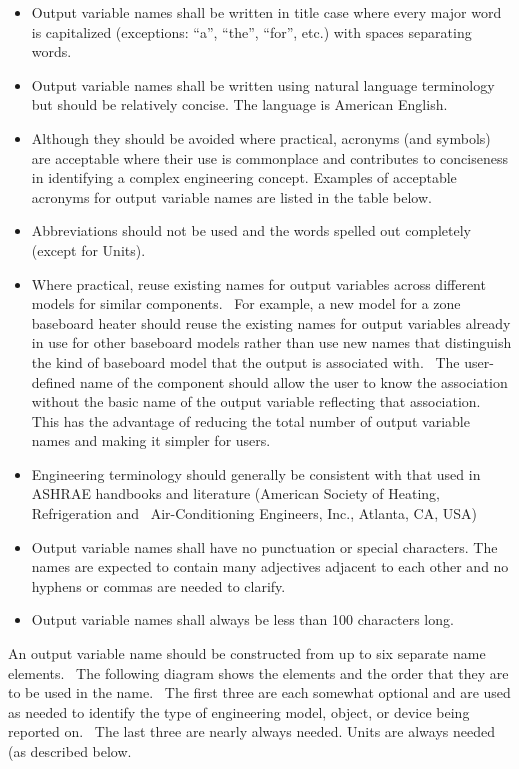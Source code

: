 \begin{itemize}
\item
  Output variable names shall be written in title case where every major word is capitalized (exceptions: ``a'', ``the'', ``for'', etc.) with spaces separating words.
\item
  Output variable names shall be written using natural language terminology but should be relatively concise. The language is American English.
\item
  Although they should be avoided where practical, acronyms (and symbols) are acceptable where their use is commonplace and contributes to conciseness in identifying a complex engineering concept. Examples of acceptable acronyms for output variable names are listed in the table below.
\item
  Abbreviations should not be used and the words spelled out completely (except for Units).
\item
  Where practical, reuse existing names for output variables across different models for similar components.~ For example, a new model for a zone baseboard heater should reuse the existing names for output variables already in use for other baseboard models rather than use new names that distinguish the kind of baseboard model that the output is associated with.~ The user-defined name of the component should allow the user to know the association without the basic name of the output variable reflecting that association.~ This has the advantage of reducing the total number of output variable names and making it simpler for users.
\item
  Engineering terminology should generally be consistent with that used in ASHRAE handbooks and literature (American Society of Heating, Refrigeration and~ Air-Conditioning Engineers, Inc., Atlanta, CA, USA)
\item
  Output variable names shall have no punctuation or special characters. The names are expected to contain many adjectives adjacent to each other and no hyphens or commas are needed to clarify.
\item
  Output variable names shall always be less than 100 characters long.
\end{itemize}

An output variable name should be constructed from up to six separate name elements.~ The following diagram shows the elements and the order that they are to be used in the name.~ The first three are each somewhat optional and are used as needed to identify the type of engineering model, object, or device being reported on.~ The last three are nearly always needed. Units are always needed (as described below.


